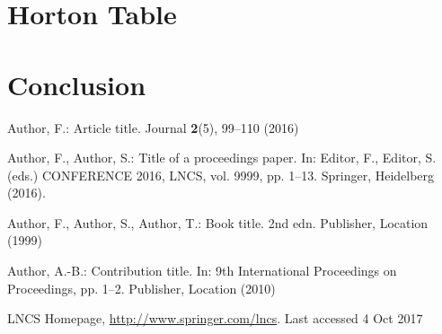 \documentclass[runningheads]{llncs}
\begin{document}
\section{Horton Table}
\section{Conclusion}
%
%
%
% 
% 
%
\begin{thebibliography}{8}
Author, F.: Article title. Journal \textbf{2}(5), 99--110 (2016)

Author, F., Author, S.: Title of a proceedings paper. In: Editor,
F., Editor, S. (eds.) CONFERENCE 2016, LNCS, vol. 9999, pp. 1--13.
Springer, Heidelberg (2016). 

Author, F., Author, S., Author, T.: Book title. 2nd edn. Publisher,
Location (1999)

Author, A.-B.: Contribution title. In: 9th International Proceedings
on Proceedings, pp. 1--2. Publisher, Location (2010)

LNCS Homepage, \url{http://www.springer.com/lncs}. Last accessed 4
Oct 2017
\end{thebibliography}
\end{document}
